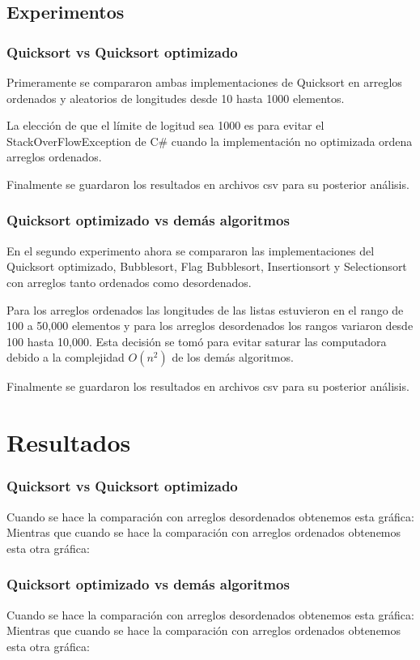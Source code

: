 \documentclass[conference]{IEEEtran}
\begin{document}
\subsection{Experimentos}
\subsubsection{Quicksort vs Quicksort optimizado}
Primeramente se compararon ambas implementaciones de Quicksort en arreglos ordenados y aleatorios de longitudes desde 10 hasta 1000 elementos.\par
La elección de que el límite de logitud sea 1000 es para evitar el StackOverFlowException de C\# cuando la implementación no optimizada ordena arreglos ordenados.\par
Finalmente se guardaron los resultados en archivos csv para su posterior análisis.



\subsubsection{Quicksort optimizado vs demás algoritmos}
En el segundo experimento ahora se compararon las implementaciones del Quicksort optimizado, Bubblesort, Flag Bubblesort, Insertionsort y Selectionsort con arreglos tanto ordenados como desordenados.\par
Para los arreglos ordenados las longitudes de las listas estuvieron en el rango de 100 a 50,000 elementos y para los arreglos desordenados los rangos variaron desde 100 hasta 10,000. Esta decisión se tomó para evitar saturar las computadora debido a la complejidad $O(n^2)$ de los demás algoritmos.\par
Finalmente se guardaron los resultados en archivos csv para su posterior análisis.



\section{Resultados}
\subsubsection{Quicksort vs Quicksort optimizado}
Cuando se hace la comparación con arreglos desordenados obtenemos esta gráfica:
Mientras que cuando se hace la comparación con arreglos ordenados obtenemos esta otra gráfica:

\subsubsection{Quicksort optimizado vs demás algoritmos}
Cuando se hace la comparación con arreglos desordenados obtenemos esta gráfica:
Mientras que cuando se hace la comparación con arreglos ordenados obtenemos esta otra gráfica:
\end{document}
